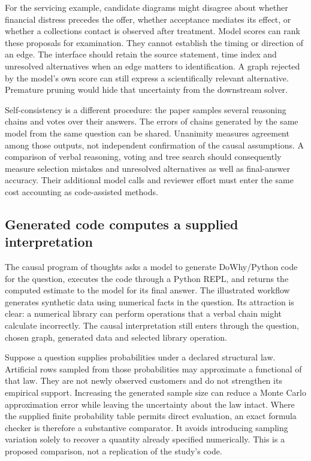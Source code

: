 For the servicing example, candidate diagrams might disagree about whether
financial distress precedes the offer, whether acceptance mediates its effect,
or whether a collections contact is observed after treatment. Model scores can
rank these proposals for examination. They cannot establish the timing or
direction of an edge. The interface should retain the source statement,
time index and unresolved alternatives when an edge matters to identification.
A graph rejected by the model's own score can still express a scientifically
relevant alternative. Premature pruning would hide that uncertainty from the
downstream solver.

Self-consistency is a different procedure: the paper samples several reasoning
chains and votes over their answers. The errors of chains generated by the same
model from the same question can be shared. Unanimity measures agreement among
those outputs, not independent confirmation of the causal assumptions. A
comparison of verbal reasoning, voting and tree search should consequently
measure selection mistakes and unresolved alternatives as well as final-answer
accuracy. Their additional model calls and reviewer effort must enter the same
cost accounting as code-assisted methods.~\citep{exec21_prophets}

\subsection{Generated code computes a supplied interpretation}
\label{exec21:prophets-calculation}
The causal program of thoughts asks a model to generate DoWhy/Python code for
the question, executes the code through a Python REPL, and returns the computed
estimate to the model for its final answer. The illustrated workflow generates
synthetic data using numerical facts in the question. Its attraction is clear:
a numerical library can perform operations that a verbal chain might calculate
incorrectly. The causal interpretation still enters through the question,
chosen graph, generated data and selected library operation.
\citep{exec21_prophets}

Suppose a question supplies probabilities under a declared structural law.
Artificial rows sampled from those probabilities may approximate a functional
of that law. They are not newly observed customers and do not strengthen its
empirical support. Increasing the generated sample size can reduce a Monte
Carlo approximation error while leaving the uncertainty about the law intact.
Where the supplied finite probability table permits direct evaluation, an exact
formula checker is therefore a substantive comparator. It avoids introducing
sampling variation solely to recover a quantity already specified numerically.
This is a proposed comparison, not a replication of the study's code.

